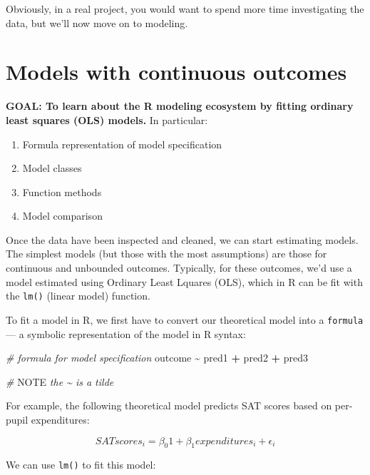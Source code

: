 \documentclass[
]{book}
\newenvironment{Shaded}{\begin{snugshade}}{\end{snugshade}}
\newcommand{\AlertTok}[1]{\textcolor[rgb]{0.94,0.16,0.16}{#1}}
\newcommand{\CommentTok}[1]{\textcolor[rgb]{0.56,0.35,0.01}{\textit{#1}}}
\newcommand{\NormalTok}[1]{#1}
\newcommand{\OperatorTok}[1]{\textcolor[rgb]{0.81,0.36,0.00}{\textbf{#1}}}
\newcommand{\StringTok}[1]{\textcolor[rgb]{0.31,0.60,0.02}{#1}}
\providecommand{\tightlist}{%
  \setlength{\itemsep}{0pt}\setlength{\parskip}{0pt}}
\begin{document}
Obviously, in a real project, you would want to spend more time investigating the data,
but we'll now move on to modeling.

\hypertarget{models-with-continuous-outcomes}{%
\section{Models with continuous outcomes}\label{models-with-continuous-outcomes}}

\textbf{GOAL: To learn about the R modeling ecosystem by fitting ordinary least squares (OLS) models.} In particular:

\begin{enumerate}
\def\labelenumi{\arabic{enumi}.}
\tightlist
\item
  Formula representation of model specification
\item
  Model classes
\item
  Function methods
\item
  Model comparison
\end{enumerate}

Once the data have been inspected and cleaned, we can start estimating models. The simplest models (but those with the most assumptions) are those for continuous and unbounded outcomes. Typically, for these outcomes, we'd use a model estimated using Ordinary Least Lquares (OLS), which in R can be fit with the \texttt{lm()} (linear model) function.

To fit a model in R, we first have to convert our theoretical model into a \texttt{formula} --- a symbolic representation of the model in R syntax:

\begin{Shaded}
\begin{Highlighting}[]
\CommentTok{\# formula for model specification}
\NormalTok{outcome }\OperatorTok{\textasciitilde{}}\StringTok{ }\NormalTok{pred1 }\OperatorTok{+}\StringTok{ }\NormalTok{pred2 }\OperatorTok{+}\StringTok{ }\NormalTok{pred3}

\CommentTok{\# }\AlertTok{NOTE}\CommentTok{ the \textasciitilde{} is a tilde}
\end{Highlighting}
\end{Shaded}

For example, the following theoretical model predicts SAT scores based on per-pupil expenditures:

\[
SATscores_i = \beta_{0}1 + \beta_1expenditures_i + \epsilon_i
\]

We can use \texttt{lm()} to fit this model:
\end{document}
